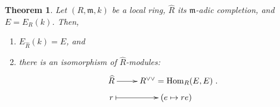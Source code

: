 \documentclass[11pt]{book}
\newtheorem{theorem}{Theorem}[chapter]
\numberwithin{equation}{section}
\numberwithin{theorem}{chapter}
\theoremstyle{definition}
\newtheorem*{basic properties}{Basic Properties}
\newtheorem*{Important Remark}{Important Remark}
\theoremstyle{remark}
\newcommand{\m}{\mathfrak{m}}
\newcommand{\Hom}{\operatorname{Hom}}
\begin{document}
%
%	


\begin{theorem}
	Let $(R,\m,k)$ be a local ring, $\widehat{R}$ its $\m$-adic completion, and $E = E_R(k)$. Then,
	\begin{enumerate}
		\item  $E_{\widehat{R}}(k) = E$, and
		\item there is an isomorphism of $\widehat{R}$-modules:
			$$\xymatrix@R=1mm{\widehat{R} \ar[r] & R^{\vee\vee}=\Hom_R(E,E) \\ r \ar@{|->}[r] & (e \mapsto re)}.$$
	\end{enumerate}
\end{theorem}
\end{document}
